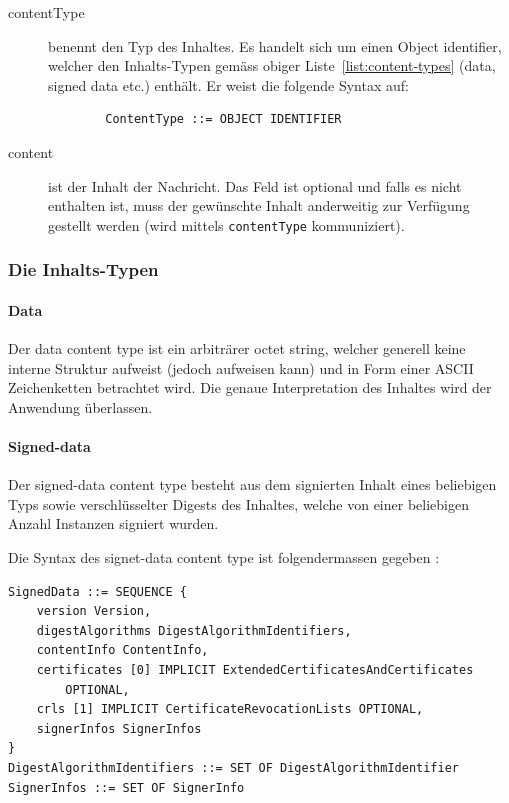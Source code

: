\documentclass[10pt,a4paper]{article}
\begin{document}
\begin{description}
    \item[contentType] benennt den Typ des Inhaltes. Es handelt sich um einen Object
        identifier, welcher den Inhalts-Typen gemäss obiger Liste~\ref{list:content-types}
        (data, signed data etc.) enthält. Er weist die folgende Syntax auf:
        \begin{verbatim}
        ContentType ::= OBJECT IDENTIFIER
        \end{verbatim}
    \item[content] ist der Inhalt der Nachricht. Das Feld ist optional und falls es nicht
        enthalten ist, muss der gewünschte Inhalt anderweitig zur Verfügung gestellt
        werden (wird mittels \texttt{contentType} kommuniziert).
\end{description}

\subsubsection{Die Inhalts-Typen}

\paragraph{Data}
Der data content type ist ein arbiträrer octet string, welcher generell keine interne
Struktur aufweist (jedoch aufweisen kann) und in Form einer ASCII Zeichenketten betrachtet
wird. Die genaue Interpretation des Inhaltes wird der Anwendung überlassen.

\paragraph{Signed-data}
Der signed-data content type besteht aus dem signierten Inhalt eines beliebigen Typs sowie
verschlüsselter Digests des Inhaltes, welche von einer beliebigen Anzahl Instanzen
signiert wurden.

Die Syntax des signet-data content type ist folgendermassen gegeben \cite[S.10]{pkcs7}:
\begin{verbatim}
SignedData ::= SEQUENCE {
    version Version,
    digestAlgorithms DigestAlgorithmIdentifiers,
    contentInfo ContentInfo,
    certificates [0] IMPLICIT ExtendedCertificatesAndCertificates
        OPTIONAL,
    crls [1] IMPLICIT CertificateRevocationLists OPTIONAL,
    signerInfos SignerInfos
}
DigestAlgorithmIdentifiers ::= SET OF DigestAlgorithmIdentifier
SignerInfos ::= SET OF SignerInfo
\end{verbatim}
\end{document}
